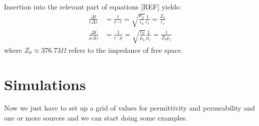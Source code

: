 \documentclass[]{report}
\begin{document}
Insertion into the relevant part of equations [REF] yields:
\begin{align}
	\frac{\Delta t}{\varepsilon \Delta z} &= \frac{1}{c \cdot \varepsilon} = \sqrt{\frac{\mu_0}{\varepsilon_0}} \frac{1}{\varepsilon_r} = \frac{Z_0}{\varepsilon_r} \\
	\frac{\Delta t}{\mu \Delta z} &= \frac{1}{c \cdot \mu} = \sqrt{\frac{\varepsilon_0}{\mu_0}} \frac{1}{\mu_r} = \frac{1}{Z_0 \mu_r}
\end{align}
where \( Z_0 \approx 376.73 \Omega \) refers to the impedance of free space.

\section{Simulations}
Now we just have to set up a grid of values for permittivity and permeability and one or more sources and we can start doing some examples.

\end{document}
